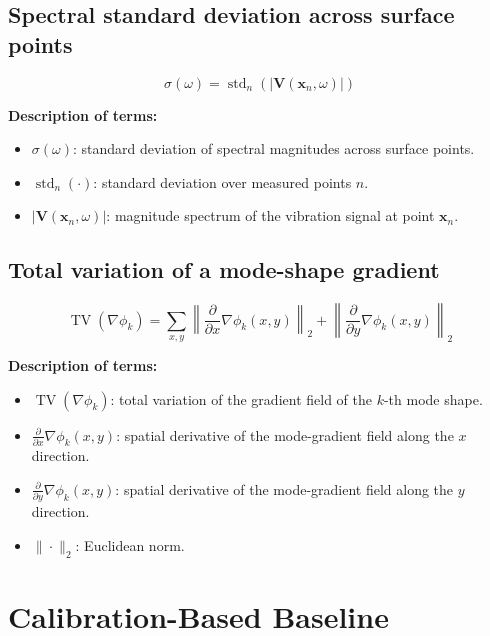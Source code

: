 \documentclass[11pt]{article}
\begin{document}
\subsection{Spectral standard deviation across surface points}

\begin{equation}
\sigma(\omega)
=
\operatorname{std}_n
\left(
\left|
\bm{V}(\bm{x}_n,\omega)
\right|
\right)
\end{equation}

\textbf{Description of terms:}

\begin{itemize}
    \item $\sigma(\omega)$: standard deviation of spectral magnitudes across surface points.
    \item $\operatorname{std}_n(\cdot)$: standard deviation over measured points $n$.
    \item $|\bm{V}(\bm{x}_n,\omega)|$: magnitude spectrum of the vibration signal at point $\bm{x}_n$.
\end{itemize}

\subsection{Total variation of a mode-shape gradient}

\begin{equation}
\operatorname{TV}
\left(
\nabla \phi_k
\right)
=
\sum_{x,y}
\left\|
\frac{\partial}{\partial x}
\nabla \phi_k(x,y)
\right\|_2
+
\left\|
\frac{\partial}{\partial y}
\nabla \phi_k(x,y)
\right\|_2
\end{equation}

\textbf{Description of terms:}

\begin{itemize}
    \item $\operatorname{TV}(\nabla \phi_k)$: total variation of the gradient field of the $k$-th mode shape.
    \item $\frac{\partial}{\partial x}\nabla \phi_k(x,y)$: spatial derivative of the mode-gradient field along the $x$ direction.
    \item $\frac{\partial}{\partial y}\nabla \phi_k(x,y)$: spatial derivative of the mode-gradient field along the $y$ direction.
    \item $\|\cdot\|_2$: Euclidean norm.
\end{itemize}

\section{Calibration-Based Baseline}
\end{document}
